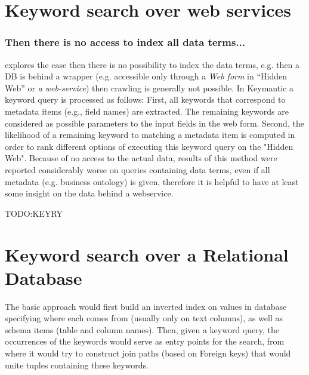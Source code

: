 \section{Keyword search over web services}

\subsubsection*{Then there is no access to index all data terms...}
\cite{Keymantic10, semantics_without_access} explores the case then there is no possibility to index the data terms, e.g. then a DB is behind a wrapper (e.g. accessible only through a \textit{Web form} in “Hidden Web” or \textit{a web-service}) then crawling is generally not possible.
%
In Keymantic\cite{Keymantic10} a keyword query is processed as follows: First, all keywords that  correspond to metadata items (e.g., field names) are extracted. The remaining keywords are considered as possible parameters to the input fields in the web form. Second, the likelihood of a remaining keyword to matching a metadata item is computed in order to rank different options of executing this keyword query on the "Hidden Web"\cite[p.942]{ethz2012}. Because of no access to the actual data, results of this method were reported considerably worse on queries containing data terms, even if all metadata (e.g. business ontology) is given\cite{ethz2012}, therefore it is helpful to have at least some insight on the data behind a webservice.

{\color{red}TODO:KEYRY}

\section{Keyword search over a Relational Database}

The basic approach would first build an inverted index on values in database specifying where each comes from (usually only on text columns), as well as schema items (table and column names). 
%
Then, given a keyword query, the occurrences of the keywords would serve as entry points for the search, from where it would try to construct join paths (based on Foreign keys) that would unite tuples containing these keywords.
% 

